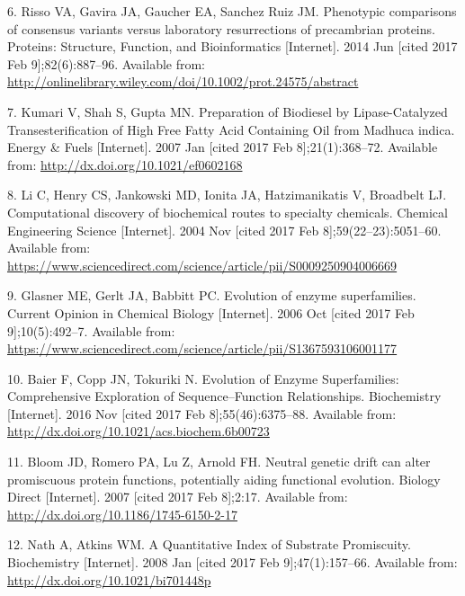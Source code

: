 \documentclass[12pt,twoside]{reedthesis}
\begin{document}
  \hypertarget{ref-risso_phenotypic_2014}{}
  6. Risso VA, Gavira JA, Gaucher EA, Sanchez Ruiz JM. Phenotypic
  comparisons of consensus variants versus laboratory resurrections of
  precambrian proteins. Proteins: Structure, Function, and Bioinformatics
  {[}Internet{]}. 2014 Jun {[}cited 2017 Feb 9{]};82(6):887--96. Available
  from:
  \url{http://onlinelibrary.wiley.com/doi/10.1002/prot.24575/abstract}
  
  \hypertarget{ref-kumari_preparation_2007}{}
  7. Kumari V, Shah S, Gupta MN. Preparation of Biodiesel by
  Lipase-Catalyzed Transesterification of High Free Fatty Acid Containing
  Oil from Madhuca indica. Energy \& Fuels {[}Internet{]}. 2007 Jan
  {[}cited 2017 Feb 8{]};21(1):368--72. Available from:
  \url{http://dx.doi.org/10.1021/ef0602168}
  
  \hypertarget{ref-li_computational_2004}{}
  8. Li C, Henry CS, Jankowski MD, Ionita JA, Hatzimanikatis V, Broadbelt
  LJ. Computational discovery of biochemical routes to specialty
  chemicals. Chemical Engineering Science {[}Internet{]}. 2004 Nov
  {[}cited 2017 Feb 8{]};59(22--23):5051--60. Available from:
  \url{https://www.sciencedirect.com/science/article/pii/S0009250904006669}
  
  \hypertarget{ref-glasner_evolution_2006}{}
  9. Glasner ME, Gerlt JA, Babbitt PC. Evolution of enzyme superfamilies.
  Current Opinion in Chemical Biology {[}Internet{]}. 2006 Oct {[}cited
  2017 Feb 9{]};10(5):492--7. Available from:
  \url{https://www.sciencedirect.com/science/article/pii/S1367593106001177}
  
  \hypertarget{ref-baier_evolution_2016}{}
  10. Baier F, Copp JN, Tokuriki N. Evolution of Enzyme Superfamilies:
  Comprehensive Exploration of Sequence--Function Relationships.
  Biochemistry {[}Internet{]}. 2016 Nov {[}cited 2017 Feb
  8{]};55(46):6375--88. Available from:
  \url{http://dx.doi.org/10.1021/acs.biochem.6b00723}
  
  \hypertarget{ref-bloom_neutral_2007}{}
  11. Bloom JD, Romero PA, Lu Z, Arnold FH. Neutral genetic drift can
  alter promiscuous protein functions, potentially aiding functional
  evolution. Biology Direct {[}Internet{]}. 2007 {[}cited 2017 Feb
  8{]};2:17. Available from:
  \url{http://dx.doi.org/10.1186/1745-6150-2-17}
  
  \hypertarget{ref-nath_quantitative_2008}{}
  12. Nath A, Atkins WM. A Quantitative Index of Substrate Promiscuity.
  Biochemistry {[}Internet{]}. 2008 Jan {[}cited 2017 Feb
  9{]};47(1):157--66. Available from:
  \url{http://dx.doi.org/10.1021/bi701448p}
  
\end{document}
